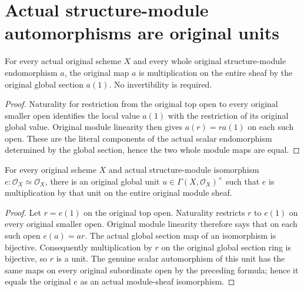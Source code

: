 \section{Actual structure-module automorphisms are original units}

\begin{lemma}
\label{lem:actual-unit-module-endomorphism-scalar}
\leanok
For every actual original scheme $X$ and every whole original
structure-module endomorphism $a$, the original map $a$ is
multiplication on the entire sheaf by the original global section
$a(1)$. No invertibility is required.
\end{lemma}
\begin{proof}
Naturality for restriction from the original top open to every
original smaller open identifies the local value $a(1)$ with the
restriction of its original global value. Original module linearity
then gives $a(r)=r a(1)$ on each such open. These are the literal
components of the actual scalar endomorphism determined by the
global section, hence the two whole module maps are equal.
\end{proof}

\begin{lemma}
\label{lem:actual-unit-module-automorphism-scalar}
\leanok
For every original scheme $X$ and actual structure-module
isomorphism $e:\mathcal O_X\simeq\mathcal O_X$, there is an original
global unit $u\in\Gamma(X,\mathcal O_X)^\times$ such that $e$ is
multiplication by that unit on the entire original module sheaf.
\end{lemma}
\begin{proof}
Let $r=e(1)$ on the original top open. Naturality restricts $r$ to
$e(1)$ on every original smaller open. Original module linearity
therefore says that on each such open $e(a)=a r$. The actual global
section map of an isomorphism is bijective. Consequently
multiplication by $r$ on the original global section ring is
bijective, so $r$ is a unit. The genuine scalar automorphism of this
unit has the same maps on every original subordinate open by the
preceding formula; hence it equals the original $e$ as an actual
module-sheaf isomorphism.
\end{proof}
